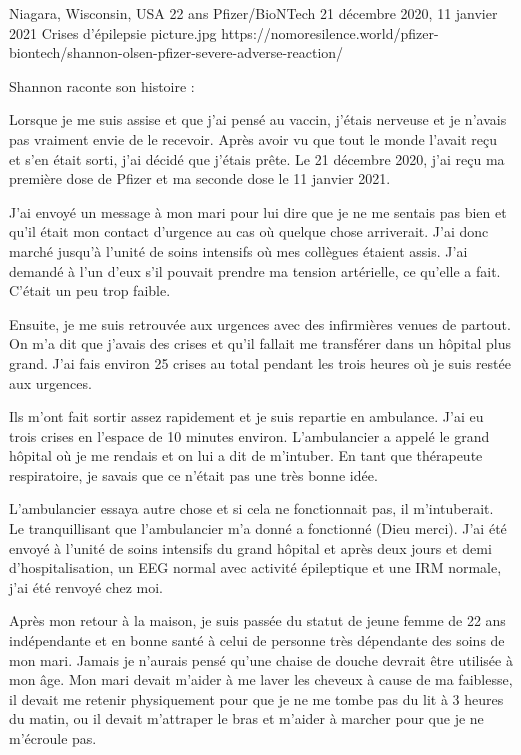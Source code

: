 {Niagara, Wisconsin, USA}
{22 ans}
{Pfizer/BioNTech}
{21 décembre 2020, 11 janvier 2021}
{Crises d'épilepsie}
{picture.jpg}
{https://nomoresilence.world/pfizer-biontech/shannon-olsen-pfizer-severe-adverse-reaction/}
{

\normalsize

Shannon raconte son histoire :

Lorsque je me suis assise et que j'ai pensé au vaccin, j'étais nerveuse et je
n'avais pas vraiment envie de le recevoir. Après avoir vu que tout le monde
l'avait reçu et s'en était sorti, j'ai décidé que j'étais prête. Le 21 décembre
2020, j'ai reçu ma première dose de Pfizer et ma seconde dose le 11 janvier
2021.

J'ai envoyé un message à mon mari pour lui dire que je ne me sentais pas bien et
qu'il était mon contact d'urgence au cas où quelque chose arriverait. J'ai donc
marché jusqu'à l'unité de soins intensifs où mes collègues étaient assis. J'ai
demandé à l'un d'eux s'il pouvait prendre ma tension artérielle, ce qu'elle a
fait. C'était un peu trop faible.

Ensuite, je me suis retrouvée aux urgences avec des infirmières venues de
partout. On m'a dit que j'avais des crises et qu'il fallait me transférer dans
un hôpital plus grand. J'ai fais environ 25 crises au total pendant les trois
heures où je suis restée aux urgences.

Ils m'ont fait sortir assez rapidement et je suis repartie en ambulance. J'ai eu
trois crises en l'espace de 10 minutes environ. L'ambulancier a appelé le grand
hôpital où je me rendais et on lui a dit de m'intuber. En tant que thérapeute
respiratoire, je savais que ce n'était pas une très bonne idée.

L'ambulancier essaya autre chose et si cela ne fonctionnait pas, il
m'intuberait. Le tranquillisant que l'ambulancier m'a donné a fonctionné (Dieu
merci). J'ai été envoyé à l'unité de soins intensifs du grand hôpital et après
deux jours et demi d'hospitalisation, un EEG normal avec activité épileptique et
une IRM normale, j'ai été renvoyé chez moi.

Après mon retour à la maison, je suis passée du statut de jeune femme de 22 ans
indépendante et en bonne santé à celui de personne très dépendante des soins de
mon mari. Jamais je n'aurais pensé qu'une chaise de douche devrait être utilisée
à mon âge. Mon mari devait m'aider à me laver les cheveux à cause de ma
faiblesse, il devait me retenir physiquement pour que je ne me tombe pas du lit
à 3 heures du matin, ou il devait m'attraper le bras et m'aider à marcher pour
que je ne m'écroule pas.

}
